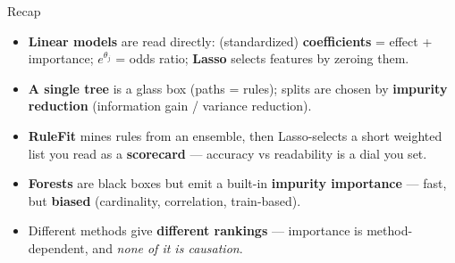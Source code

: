\documentclass[aspectratio=169]{beamer}
\begin{document}
\begin{frame}{Recap}
  \begin{itemize}\small
    \item \textbf{Linear models} are read directly: (standardized) \textbf{coefficients} =
      effect + importance; $e^{\theta_j}$ = odds ratio; \textbf{Lasso} selects features by zeroing them.
    \item \textbf{A single tree} is a glass box (paths = rules); splits are chosen by
      \textbf{impurity reduction} (information gain / variance reduction).
    \item \textbf{RuleFit} mines rules from an ensemble, then Lasso-selects a short weighted
      list you read as a \textbf{scorecard} --- accuracy vs readability is a dial you set.
    \item \textbf{Forests} are black boxes but emit a built-in \textbf{impurity importance} ---
      fast, but \textbf{biased} (cardinality, correlation, train-based).
    \item Different methods give \textbf{different rankings} --- importance is method-dependent,
      and \emph{none of it is causation}.
  \end{itemize}
  \vfill
\end{frame}
\end{document}
